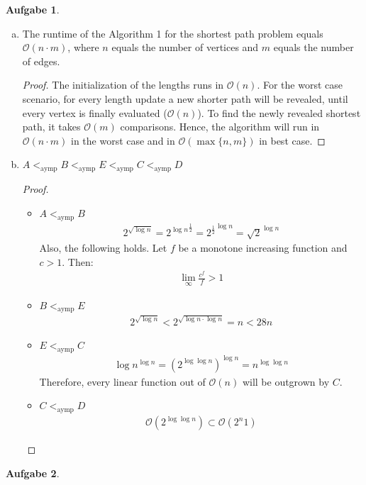 \documentclass[a4paper,12pt,headsepline]{scrartcl}
\newtheorem{aufgabe}{Aufgabe}
\begin{document}
\begin{aufgabe}
\end{aufgabe}

\begin{enumerate}[a)]
	\item The runtime of the Algorithm 1 for the shortest path problem equals $\mathcal{O}(n\cdot m)$, where $n$ equals the number of vertices and $m$ equals the number of edges.
	\begin{proof}
		The initialization of the lengths runs in $\mathcal{O}(n)$. For the worst case scenario, for every length update a new shorter path will be revealed, until every vertex is finally evaluated ($\mathcal{O}(n)$). To find the newly revealed shortest path, it takes $\mathcal{O}(m)$ comparisons. Hence, the algorithm will run in $\mathcal{O}(n\cdot m)$ in the worst case and in $\mathcal{O}(\max\{n,m\})$ in best case.
	\end{proof}
	\item $A <_{\text{aymp}} B<_{\text{aymp}} E <_{\text{aymp}} C <_{\text{aymp}} D$
	\begin{proof}
		\begin{itemize}
			\item $A <_{\text{aymp}} B$
			\begin{align*}
				 2^{\sqrt{\log n}} = {2^{\log n}}^{\frac{1}{2}} = {2^{\frac{1}{2}}}^{\log n} = \sqrt{2}^{\log n}
			\end{align*}
			Also, the following holds. Let $f$ be a monotone increasing function and $c > 1$. Then:
			\begin{align*}
				\lim\limits_{\infty}\frac{c^f}{f} > 1
			\end{align*}
			\item $B <_{\text{aymp}} E$
			\begin{align*}
				2^{\sqrt{\log n}} < 2^{\sqrt{\log n \cdot \log n}} = n < 28n
			\end{align*}
			\item $E <_{\text{aymp}} C$
			\begin{align*}
				\log n^{\log n} = (2^{\log \log n})^{\log n}= n^{\log \log n}
			\end{align*}
			Therefore, every linear function out of $\mathcal{O}(n)$ will be outgrown by $C$.
			\item $C <_{\text{aymp}} D$
			\begin{align*}
				\mathcal{O}(2^{\log \log n}) \subset \mathcal{O}(2^n1)
			\end{align*}
		\end{itemize}
	\end{proof} 
\end{enumerate}

\begin{aufgabe}
\end{aufgabe}
\end{document}
